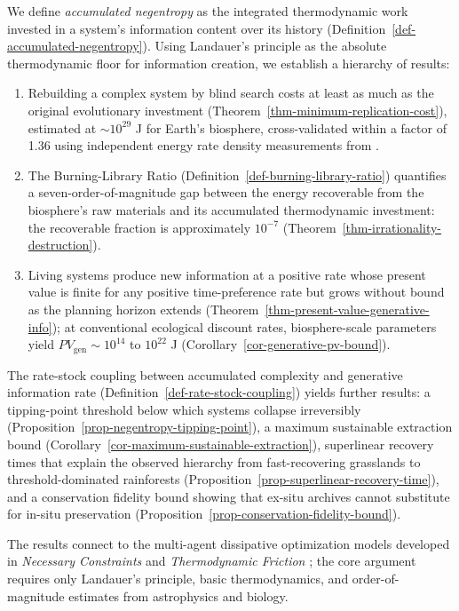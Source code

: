 \documentclass[11pt]{article}
\theoremstyle{plain}
\theoremstyle{definition}
\theoremstyle{remark}
\providecommand{\tightlist}{%
  \setlength{\itemsep}{0pt}\setlength{\parskip}{0pt}}
\begin{document}
We define \emph{accumulated negentropy} as the integrated thermodynamic
work invested in a system's information content over its history
(Definition~\ref{def-accumulated-negentropy}). Using Landauer's
principle \citep{Landauer1961} as the absolute thermodynamic floor for
information creation, we establish a hierarchy of results:

\begin{enumerate}
\def\labelenumi{\arabic{enumi}.}
\tightlist
\item
  Rebuilding a complex system by blind search costs at least as much as
  the original evolutionary investment
  (Theorem~\ref{thm-minimum-replication-cost}), estimated at
  \(\sim 10^{29}\) J for Earth's biosphere, cross-validated within a
  factor of 1.36 using independent energy rate density measurements from
  \citep{Chaisson2011}.
\item
  The Burning-Library Ratio (Definition~\ref{def-burning-library-ratio})
  quantifies a seven-order-of-magnitude gap between the energy
  recoverable from the biosphere's raw materials and its accumulated
  thermodynamic investment: the recoverable fraction is approximately
  \(10^{-7}\) (Theorem~\ref{thm-irrationality-destruction}).
\item
  Living systems produce new information at a positive rate whose
  present value is finite for any positive time-preference rate but
  grows without bound as the planning horizon extends
  (Theorem~\ref{thm-present-value-generative-info}); at conventional
  ecological discount rates, biosphere-scale parameters yield
  \(PV_{\text{gen}} \sim 10^{14}\) to \(10^{22}\) J
  (Corollary~\ref{cor-generative-pv-bound}).
\end{enumerate}

The rate-stock coupling between accumulated complexity and generative
information rate (Definition~\ref{def-rate-stock-coupling}) yields
further results: a tipping-point threshold below which systems collapse
irreversibly (Proposition~\ref{prop-negentropy-tipping-point}), a
maximum sustainable extraction bound
(Corollary~\ref{cor-maximum-sustainable-extraction}), superlinear
recovery times that explain the observed hierarchy from fast-recovering
grasslands to threshold-dominated rainforests
(Proposition~\ref{prop-superlinear-recovery-time}), and a conservation
fidelity bound showing that ex-situ archives cannot substitute for
in-situ preservation
(Proposition~\ref{prop-conservation-fidelity-bound}).

The results connect to the multi-agent dissipative optimization models
developed in \emph{Necessary Constraints} \citep{TC-I} and
\emph{Thermodynamic Friction} \citep{TC-IV}; the core argument requires
only Landauer's principle, basic thermodynamics, and order-of-magnitude
estimates from astrophysics and biology.
\end{document}
